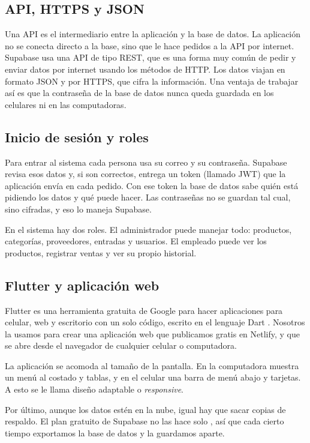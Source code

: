 \documentclass[12pt,a4paper]{article}
\begin{document}
\subsection{API, HTTPS y JSON}

Una API es el intermediario entre la aplicación y la base de datos. La aplicación no se conecta directo a la base, sino que le hace pedidos a la API por internet. Supabase usa una API de tipo REST, que es una forma muy común de pedir y enviar datos por internet usando los métodos de HTTP. Los datos viajan en formato JSON y por HTTPS, que cifra la información. Una ventaja de trabajar así es que la contraseña de la base de datos nunca queda guardada en los celulares ni en las computadoras.

\subsection{Inicio de sesión y roles}

Para entrar al sistema cada persona usa su correo y su contraseña. Supabase revisa esos datos y, si son correctos, entrega un token (llamado JWT) que la aplicación envía en cada pedido. Con ese token la base de datos sabe quién está pidiendo los datos y qué puede hacer. Las contraseñas no se guardan tal cual, sino cifradas, y eso lo maneja Supabase.

En el sistema hay dos roles. El administrador puede manejar todo: productos, categorías, proveedores, entradas y usuarios. El empleado puede ver los productos, registrar ventas y ver su propio historial.

\subsection{Flutter y aplicación web}

Flutter es una herramienta gratuita de Google para hacer aplicaciones para celular, web y escritorio con un solo código, escrito en el lenguaje Dart \cite{flutter}. Nosotros la usamos para crear una aplicación web que publicamos gratis en Netlify, y que se abre desde el navegador de cualquier celular o computadora.

La aplicación se acomoda al tamaño de la pantalla. En la computadora muestra un menú al costado y tablas, y en el celular una barra de menú abajo y tarjetas. A esto se le llama diseño adaptable o \textit{responsive}.

Por último, aunque los datos estén en la nube, igual hay que sacar copias de respaldo. El plan gratuito de Supabase no las hace solo \cite{supabasedocs}, así que cada cierto tiempo exportamos la base de datos y la guardamos aparte.
\end{document}

